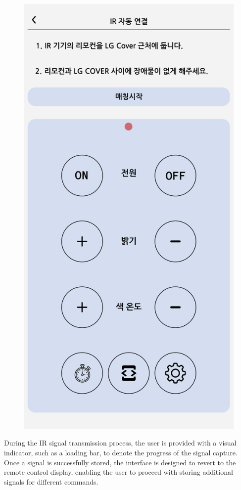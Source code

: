 \documentclass[conference]{IEEEtran}
\begin{document}
\begin{enumerate}[label=\arabic*.]
\begin{enumerate}[label=\alph*.]
\begin{itemize}
\begin{figure}[H]\centering \includegraphics[scale=0.4]{images/sw-spec-15.png}\end{figure}
During the IR signal transmission process, the user is provided with a visual indicator, such as a loading bar, to denote the progress of the signal capture. Once a signal is successfully stored, the interface is designed to revert to the remote control display, enabling the user to proceed with storing additional signals for different commands.\\

\end{itemize}
\end{enumerate}
\end{enumerate}
\end{document}
